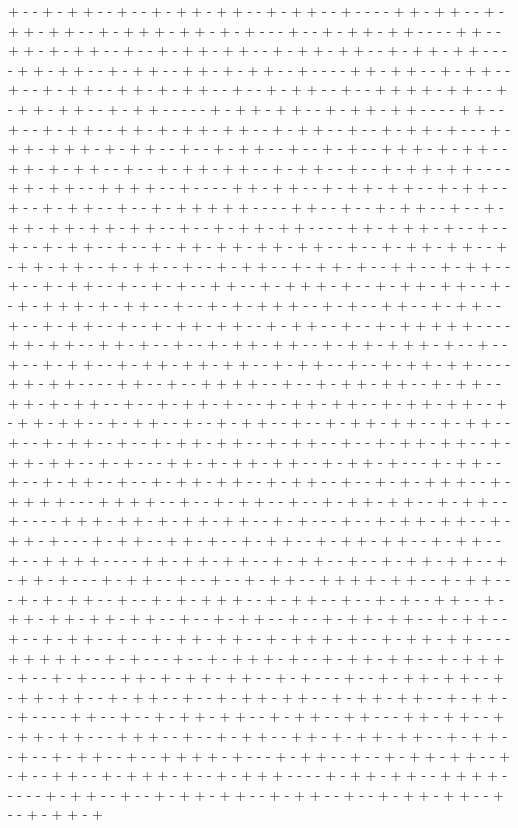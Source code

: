 + - - + - + + - - + - - + - + + - + + - - + - + + - - + - - - - + + - + + - - + - + + - + + - - + - + + + - + + - + - + - - - + - - + - + + - + + - - - - + + - - + + - + - + + - - + - - + - + + - + + - - + - + + - + + - - + - + + - + + - - - - + + - + + - - + - + + - - + + - + - + + - - + - - - - + + - + + - - + - + + - - + - - + - + + - - + + - + - + + - - + - - + - + + - - + - - + + + + - + + - - + - + + - + + - - + - + + - - - - - + - + + - + + - - + - + + - + + - - - - + + - - + - - + - + + - - + + - + - + + - + + - - + - + + - - + - - + - + + - + - - - + - + + - + + + - + - + + - - + - - + - + + - - + - - + - + - - + + + - + - + + - - + + - + - + + - - + - - + - + + - + + - - + - + + - - + - - + - + + - + + - - - - + + - + + - - + + + + - - + - - - - + + - + + - - + - + + - + + - - + - + + - - + - - + - + + - - + - - + - + + + + + - - - - + + - - + - - + - + + - - + - - + - + + - + + - + + - + + - - + - - + - + + - + + - - - - + + - + + + - + - - + - - + - - + - + + - - + - - + - + + - + + - + + - + + - - + - - + - + + - + + - - + - + + - + + - - + - + + - - + - - + - + + - - + - + + - + - - + + - - + - + + - - + - - + - + + - - + - - + - + - - + + - - + - + + + - + - - + - + + - + + - - + - - + - + + + - + - + + - - + - - + - + - + + + - - + - + - - + + - - + - + + - - + - - + - + + - - + - - + - + + - + + - - + - + + - - + - - + - + + + + + - - - - + + - + + - - + + - + - - + - - + - + + - + + - - + - + + - + + + - + - - + - - + - - + - + + - - + - + + - + + - + + - - + - + + - - + - - + - + + - + + - - - - + + - + + - - - - + + - - + - - + + + + - - + - - + - + + - + + - - + - + + - - + + - + - + + - - + - - + - + + - + - - - + - + + - + + - - + - + + - + + - - + - + + - + + - - + - + + - - + - - + - + + - - + - - + - + + - + + - - + - + + - - + - - + - + + - - + - - + - + + - + + - - + - + + - - + - - + - + + - + + - - + - + + - + + - - + - + - - - + + - + - + + - + + - - + - + + - + - - - + - + + - - + - - + - + + - - + - - + - + + - + + - - + - + + - - + - - + - + - + + + - - + - + + + + - - - + + + + - - + - - + - + + - - + - - + - + + - + + - - + - + + - - + - - - - + + + - + + - + - + + - + + - - + - + - - - + - - + - + + - + + - - + - + + - + - - - + - + + - - + + - + - - + - + + - - + - + + - + + - - + - + + - - + - - + + + + - - - - + + - + + - + + - - + - + + - - + - - + - + + - + + - - + - + + - + - - - + - + + - - + - - + - - + - + + - - + + + + - + + - - + - + + - - - + - + - + + - - + - - + - + - + + + - - + - + + - - + - - + - + - - + + - - + - + + - + + - + + - + + - - + - - + - + + - - + - - + - + + - + + - - + - + + - - + - - + - + + - - + - - + - + + - + + - - + - + + + - + - - + - + + - + + - - - - + + + + + - - + - + - - - + - - + - + + + - + - - + - + + - + + - - + - + + + - + - - + - + - - - + + - + - + + - + + - - + - + - - - + - - + - + + - + + - - + - + + - + + - - + - + + - - + - - + - + + - + + - - + - + + - + + - - + - + + - - + - - - - + + - - + - - + - + + - + + - - + - + + - - + + - - - + + - + + - - + - + + - + + - - - + + + - - + - - + - + + - - + + - + - + + - + + - - + - + + - - + - - + - + + - - + - - + + + + - + - - - + - + + - - + - - + - + + - + + - - + - + - - + + - - + - + + + - + - - + - + + + - - - - + - + + - + + - - + + + + - - - - - + - + + - - + - - + - + + - + + - - + - + + - - + - - + - + + - + + - - + - - + - + + - + 